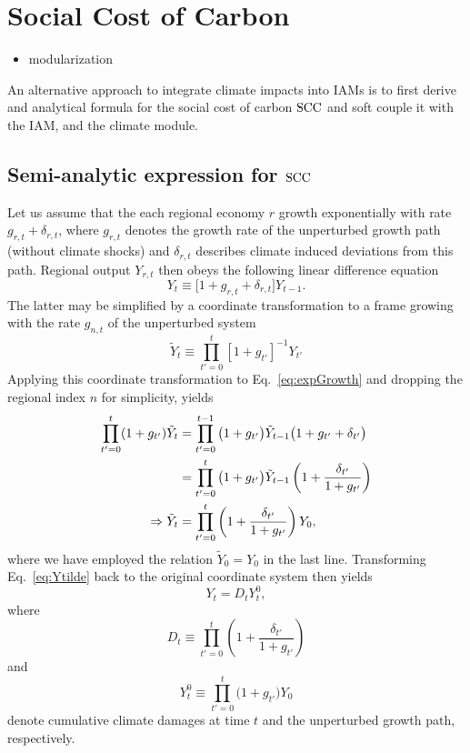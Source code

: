 \documentclass[preprint,3p,authoryear]{elsarticle}
\begin{document}
\section{Social Cost of Carbon}
\label{sec:SCC}

\begin{itemize}
\item modularization
\end{itemize}
An alternative approach to integrate climate impacts into IAMs is to first derive and analytical formula for the social cost of carbon $\operatorname{SCC}$ and soft couple it with the IAM, and the climate module.

\subsection{Semi-analytic expression for $\operatorname{SCC}$}
\label{subsec:analytSCC}
Let us assume that the each regional economy $r$ growth exponentially with rate $g_{r,t}+\delta_{r,t}$, where $g_{r,t}$ denotes the growth rate of the unperturbed growth path (without climate shocks) and $\delta_{r,t}$ describes climate induced deviations from this path. Regional output $Y_{r,t}$ then obeys the following linear difference equation
\begin{equation}
  \label{eq:expGrowth}
  Y_t\equiv\big[1+g_{r,t}+\delta_{r,t}\big]Y_{t-1}.
\end{equation}
The latter may be simplified by a coordinate transformation to a frame growing with the rate $g_{n,t}$ of the unperturbed system
\begin{equation}
  \label{eq:growFrame}
  \tilde{Y}_t\equiv\prod_{t'=0}^t\left[1+g_{t'}\right]^{-1}Y_{t'}
\end{equation}
Applying this coordinate transformation to Eq.~\eqref{eq:expGrowth} and dropping the regional index $n$ for simplicity, yields
\begin{align}
\prod_{t'=0}^t(1+g_{t'})\tilde{Y}_t &= \prod_{t'=0}^{t-1}\big(1+g_{t'}\big)\tilde{Y}_{t-1}\big(1+g_{t'}+\delta_{t'}\big)\notag\\                                   &=\prod_{t'=0}^{t}\big(1+g_{t'}\big)\tilde{Y}_{t-1}\left(1+\frac{\delta_{t'}}{1+g_{t'}}\right)\notag\\
  \Rightarrow \tilde{Y}_{t} &= \prod_{t'=0}^{t}\left(1+\frac{\delta_{t'}}{1+g_{t'}}\right)Y_0\label{eq:Ytilde},
\end{align}
where we have employed the relation $\tilde{Y}_0=Y_0$ in the last line. Transforming Eq.~\eqref{eq:Ytilde} back to the original coordinate system then yields
\begin{equation}
  \label{eq:1}
  Y_t=D_tY^0_t,
\end{equation}
where
\begin{equation}
  \label{eq:D}
  D_t\equiv\prod_{t'=0}^{t}\left(1+\frac{\delta_{t'}}{1+g_{t'}}\right)
\end{equation}
and
\begin{equation}
  \label{eq:YNull}
 Y^0_t\equiv\prod_{t'=0}^{t} \big(1+g_{t'}\big)Y_0 
\end{equation}
 denote cumulative climate damages at time $t$ and the unperturbed growth path, respectively.
\end{document}
